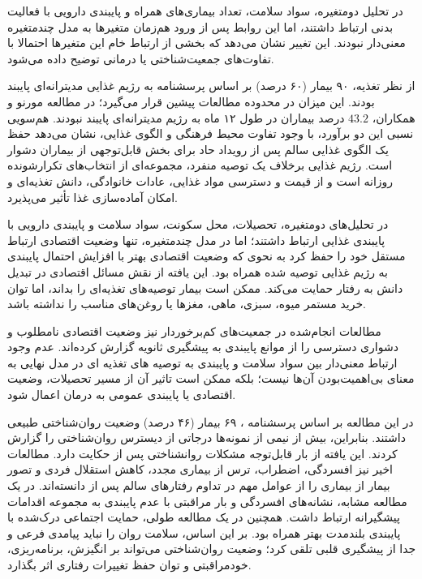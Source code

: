 در تحلیل دومتغیره، سواد سلامت، تعداد بیماری‌های همراه و پایبندی دارویی با فعالیت بدنی ارتباط داشتند، اما این روابط پس از ورود هم‌زمان متغیرها به مدل چندمتغیره معنی‌دار نبودند. این تغییر نشان می‌دهد که بخشی از ارتباط خام این متغیرها احتمالا با تفاوت‌های جمعیت‌شناختی یا درمانی توضیح داده می‌شود.

از نظر تغذیه، ۹۰ بیمار (۶۰ درصد) بر اساس پرسشنامه  به رژیم غذایی مدیترانه‌ای پایبند بودند. این میزان در محدوده مطالعات پیشین قرار می‌گیرد؛ در مطالعه مورنو و همکاران، $43.2$ درصد بیماران در طول ۱۲ ماه به رژیم مدیترانه‌ای پایبند نبودند\cite{Moreno2024NonAdherence}. هم‌سویی نسبی این دو برآورد، با وجود تفاوت محیط فرهنگی و الگوی غذایی، نشان می‌دهد حفظ یک الگوی غذایی سالم پس از رویداد حاد برای بخش قابل‌توجهی از بیماران دشوار است. رژیم غذایی برخلاف یک توصیه منفرد، مجموعه‌ای از انتخاب‌های تکرارشونده روزانه است و از قیمت و دسترسی مواد غذایی، عادات خانوادگی، دانش تغذیه‌ای و امکان آماده‌سازی غذا تأثیر می‌پذیرد\cite{Krezel2024Nutrition,Deslippe2023Barriers,Katsi2025Diet}.

در تحلیل‌های دومتغیره، تحصیلات، محل سکونت، سواد سلامت و پایبندی دارویی با پایبندی غذایی ارتباط داشتند؛ اما در مدل چندمتغیره، تنها وضعیت اقتصادی ارتباط مستقل خود را حفظ کرد به نحوی که وضعیت اقتصادی بهتر با افزایش احتمال پایبندی به رژیم غذایی توصیه شده همراه بود. این یافته از نقش مسائل اقتصادی در تبدیل دانش به رفتار حمایت می‌کند. ممکن است بیمار توصیه‌های تغذیه‌ای را بداند، اما توان خرید مستمر میوه، سبزی، ماهی، مغزها یا روغن‌های مناسب را نداشته باشد.

مطالعات انجام‌شده در جمعیت‌های کم‌برخوردار نیز وضعیت اقتصادی نامطلوب و دشواری دسترسی را از موانع پایبندی به پیشگیری ثانویه گزارش کرده‌اند\cite{Mohandas2025RecurrentMI}. عدم وجود ارتباط معنی‌دار بین سواد سلامت و پایبندی به توصیه های تغذیه ای در مدل نهایی به معنای بی‌اهمیت‌بودن آن‌ها نیست؛ بلکه ممکن است تاثیر آن از مسیر تحصیلات، وضعیت اقتصادی یا پایبندی عمومی به درمان اعمال شود.

در این مطالعه بر اساس پرسشنامه ، ۶۹ بیمار (۴۶ درصد) وضعیت روان‌شناختی طبیعی داشتند. بنابراین، بیش از نیمی از نمونه‌ها درجاتی از دیسترس روان‌شناختی را گزارش کردند. این یافته از بار قابل‌توجه مشکلات روانشناختی پس از  حکایت دارد. مطالعات اخیر نیز افسردگی، اضطراب، ترس از بیماری مجدد، کاهش استقلال فردی و تصور بیمار از بیماری را از عوامل مهم در تداوم رفتارهای سالم پس از  دانسته‌اند\cite{AlFaraj2025MentalHealth}. در یک مطالعه مشابه، نشانه‌های افسردگی و بار مراقبتی با عدم پایبندی به مجموعه اقدامات پیشگیرانه ارتباط داشت. همچنین در یک مطالعه طولی، حمایت اجتماعی درک‌شده با پایبندی بلندمدت بهتر همراه بود\cite{Moreno2024NonAdherence,Nachshol2020Psychosocial}. بر این اساس، سلامت روان را نباید پیامدی فرعی و جدا از پیشگیری قلبی تلقی کرد؛ وضعیت روان‌شناختی می‌تواند بر انگیزش، برنامه‌ریزی، خودمراقبتی و توان حفظ تغییرات رفتاری اثر بگذارد.


